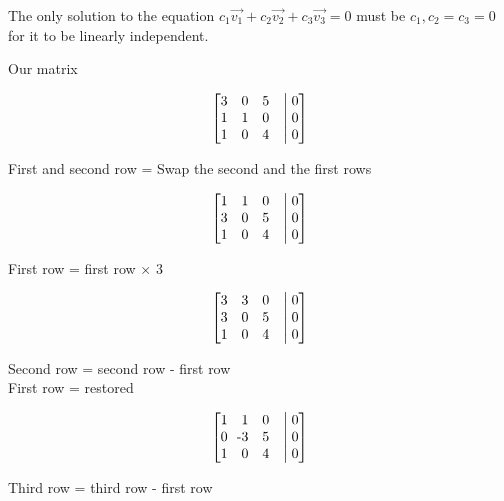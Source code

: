 \documentclass[11pt]{article}
\begin{document}
The only solution to the equation $c_1\vec{v_1}+ c_2\vec{v_2}+ c_3\vec{v_3} = 0$ must be $c_1, c_2 = c_3 = 0$ for it to be linearly independent.
\begin{center}
Our matrix
\end{center}
\vspace*{-\baselineskip}
\begin{align*}
    \begin{bmatrix}
    3 & 0 & 5 &\bigm|  0\\
    1 & 1 & 0 &\bigm| 0\\
    1 & 0 & 4 &\bigm| 0
    \end{bmatrix}
\end{align*}
\begin{center}
First and second row = Swap the second and the first rows
\end{center}
\vspace*{-\baselineskip}
\begin{align*}
    \begin{bmatrix}
    1 & 1 & 0 &\bigm| 0\\
    3 & 0 & 5 &\bigm|  0\\
    1 & 0 & 4 &\bigm| 0
    \end{bmatrix}
\end{align*}
\begin{center}
First row = first row $\times$ 3
\end{center}
\vspace*{-\baselineskip}
\begin{align*}
    \begin{bmatrix}
    3 & 3 & 0 &\bigm| 0\\
    3 & 0 & 5 &\bigm|  0\\
    1 & 0 & 4 &\bigm| 0
    \end{bmatrix}
\end{align*}
\begin{center}
Second row = second row -  first row\\
First row = restored
\end{center}
\vspace*{-\baselineskip}
\begin{align*}
    \begin{bmatrix}
    1 & 1 & 0 &\bigm| 0\\
    0 & \llap{-}3 & 5 &\bigm|  0\\
    1 & 0 & 4 &\bigm| 0
    \end{bmatrix}
\end{align*}
\begin{center}
Third row = third row - first row
\end{center}
\end{document}
